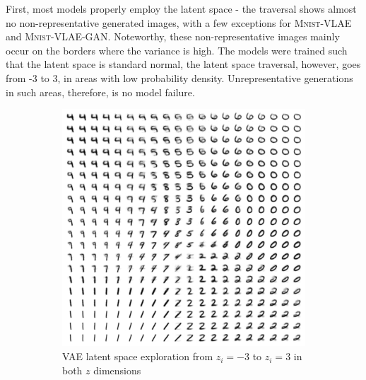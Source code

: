 First, most models properly employ the latent space - the traversal shows almost no non-representative generated images, with a few exceptions for \textsc{Mnist}-\ac{VLAE} and \textsc{Mnist}-\ac{VLAE}-\ac{GAN}.
Noteworthy, these non-representative images mainly occur on the borders where the variance is high.
The models were trained such that the latent space is standard normal, the latent space traversal, however, goes from -3 to 3, in areas with low probability density.
Unrepresentative generations in such areas, therefore, is no model failure.

\begin{figure}
    \centering
    \begin{subfigure}{.45\textwidth}
        \centering
        \includegraphics[width=\textwidth]{images/latent_space_traversals/vae_mnist.png}
        \caption{VAE latent space exploration from $z_i=-3$ to $z_i=3$ in both $z$ dimensions}
    \end{subfigure}
    \hfill
    \begin{subfigure}{.45\textwidth}
        \centering

\end{subfigure}
\end{figure}
